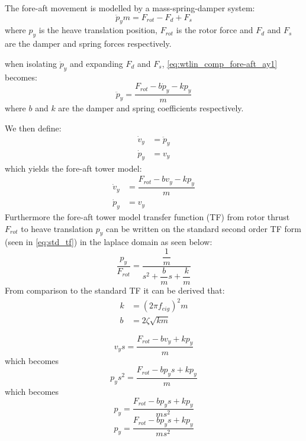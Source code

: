 The fore-aft movement is modelled by a mass-spring-damper system:
\begin{equation}\label{eq:wtlin_comp_fore-aft_ay1}
	\ddot{p}_y m = F_{rot} - F_d + F_s
\end{equation}
where $ p_y $ is the heave translation position, $ F_{rot} $ is the rotor force and $ F_d $ and $ F_s $ are the damper and spring forces respectively.

when isolating $ \ddot{p}_y $ and expanding $ F_d $ and $ F_s $, \cref{eq:wtlin_comp_fore-aft_ay1} becomes:
\begin{equation}\label{eq:wtlin_comp_fore-aft_ay2}
	\ddot{p}_y = \dfrac{F_{rot} - b \dot{p}_y - k p_y}{m}
\end{equation}
where $ b $ and $ k $ are the damper and spring coefficients respectively.

We then define:
\begin{align}
	\dot{v}_y & = \ddot{p}_y \label{eq:wtlin_comp_fore-aft_ay} \\
	\dot{p}_y & = v_y \label{eq:wtlin_comp_fore-aft_vy}
\end{align}
which yields the fore-aft tower model:
\begin{align}
	\dot{v}_y & = \dfrac{F_{rot} - b v_y - k p_y}{m}  \label{eq:wtlin_comp_fore-aft_1} \\
	\dot{p}_y & = v_y \label{eq:wtlin_comp_fore-aft_2}
\end{align}
Furthermore the fore-aft tower model transfer function (TF) from rotor thrust $ F_{rot} $ to heave translation $ p_y $ can be written on the standard second order TF form (seen in \cref{eq:std_tf}) in the laplace domain as seen below:
\begin{equation}\label{eq:wtLin_fore_aft_tf}
	\dfrac{p_y}{F_{rot}} = \dfrac{\dfrac{1}{m}}{s^2 + \dfrac{b}{m} s + \dfrac{k}{m}}
\end{equation}
From comparison to the standard TF it can be derived that:
\begin{align}
	k & = (2 \pi f_{eig})^2 m \label{eq:wtLin_fore_aft_tf_k} \\
	b & = 2 \zeta \sqrt{k m} \label{eq:wtLin_fore_aft_tf_b}
\end{align}


\begin{equation}
	v_y s= \dfrac{F_{rot} - b v_y + k p_y}{m}
\end{equation}
which becomes
\begin{equation}
	p_y s^2 = \dfrac{F_{rot} - b p_y s + k p_y}{m}
\end{equation}
which becomes
\begin{equation}
	p_y = \dfrac{F_{rot} - b p_y s + k p_y}{m s^2}
\end{equation}
\begin{equation}
	p_y = \dfrac{F_{rot} - b p_y s + k p_y}{m s^2}
\end{equation}

